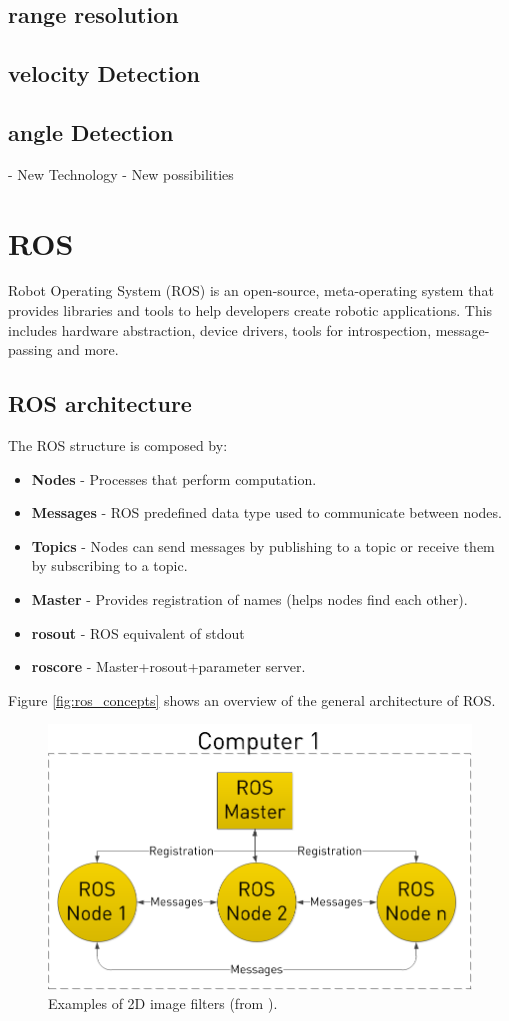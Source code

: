 \subsection{range resolution}
\subsection{velocity Detection}
\subsection{angle Detection}

- New Technology
- New possibilities
\section {ROS}
Robot Operating System (ROS) is an open-source, meta-operating system that provides libraries and tools to help developers create robotic applications. This includes hardware abstraction, device drivers, tools for introspection, message-passing and more.
\subsection{ROS architecture}
The ROS structure is composed by:
\begin{itemize}
\item \textbf{Nodes} - Processes that perform computation.
\item \textbf{Messages} - ROS predefined data type used to communicate between nodes. 
\item \textbf{Topics} - Nodes can send messages by publishing to a topic or receive them by subscribing to a topic. 
\item \textbf{Master} - Provides registration of names (helps nodes find each other).
\item \textbf{rosout} - ROS equivalent of stdout 
\item \textbf{roscore} - Master+rosout+parameter server. 
\end{itemize}


Figure \ref{fig:ros_concepts} shows an overview of the general architecture of ROS.

\begin{figure}[h] 
\centerline{\includegraphics [width=0.5 \textwidth]{imgs/chapter2/rosgraph.png}}
\caption{Examples of 2D image filters (from \cite{baranov2014}).}
\label{fig:exemploskernel}
\end{figure}
